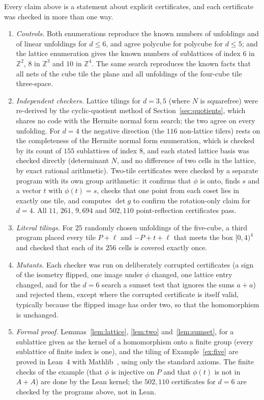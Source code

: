 \documentclass[11pt]{amsart}
\theoremstyle{definition}
\theoremstyle{remark}
\newcommand{\Z}{\mathbb{Z}}
\begin{document}
Every claim above is a statement about explicit certificates, and each certificate was checked in more than one way.
\begin{enumerate}
\item \emph{Controls.} Both enumerations reproduce the known numbers of unfoldings and of linear unfoldings for $d\le6$, and agree polycube for polycube for $d\le5$; and the lattice enumeration gives the known numbers of sublattices of index $6$ in $\Z^2$, $8$ in $\Z^3$ and $10$ in $\Z^4$. The same search reproduces the known facts that all nets of the cube tile the plane and all unfoldings of the four-cube tile three-space.
\item \emph{Independent checkers.} Lattice tilings for $d=3,5$ (where $N$ is squarefree) were re-derived by the cyclic-quotient method of Section~\ref{sec:quotients}, which shares no code with the Hermite normal form search; the two agree on every unfolding. For $d=4$ the negative direction (the $116$ non-lattice tilers) rests on the completeness of the Hermite normal form enumeration, which is checked by its count of $155$ sublattices of index $8$, and each stated lattice basis was checked directly (determinant $N$, and no difference of two cells in the lattice, by exact rational arithmetic). Two-tile certificates were checked by a separate program with its own group arithmetic: it confirms that $\phi$ is onto, finds $s$ and a vector $t$ with $\phi(t)=s$, checks that one point from each coset lies in exactly one tile, and computes $\det g$ to confirm the rotation-only claim for $d=4$. All $11$, $261$, $9{,}694$ and $502{,}110$ point-reflection certificates pass.
\item \emph{Literal tilings.} For $25$ randomly chosen unfoldings of the five-cube, a third program placed every tile $P+\ell$ and $-P+t+\ell$ that meets the box $[0,4)^4$ and checked that each of its $256$ cells is covered exactly once.
\item \emph{Mutants.} Each checker was run on deliberately corrupted certificates (a sign of the isometry flipped, one image under $\phi$ changed, one lattice entry changed, and for the $d=6$ search a sumset test that ignores the sums $a+a$) and rejected them, except where the corrupted certificate is itself valid, typically because the flipped image has order two, so that the homomorphism is unchanged.
\item \emph{Formal proof.} Lemmas~\ref{lem:lattice}, \ref{lem:two} and~\ref{lem:sumset}, for a sublattice given as the kernel of a homomorphism onto a finite group (every sublattice of finite index is one), and the tiling of Example~\ref{ex:five} are proved in Lean~4 with Mathlib~\cite{mathlib}, using only the standard axioms. The finite checks of the example (that $\phi$ is injective on $P$ and that $\phi(t)$ is not in $A+A$) are done by the Lean kernel; the $502{,}110$ certificates for $d=6$ are checked by the programs above, not in Lean.
\end{enumerate}
\end{document}
